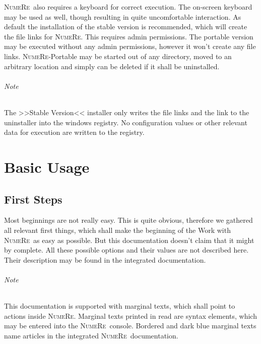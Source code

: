 \documentclass[DIV=14,headsepline,footsepline]{scrbook}
\newcommand{\NR}{\textsc{Nu\-me\-Re}}
\begin{document}
			\NR\ also requires a keyboard for correct execution. The on-screen keyboard may be used as well, though resulting in quite uncomfortable interaction.
			As default the installation of the stable version is recommended, which will create the file links for \NR. This requires admin permissions. The portable version may be executed without any admin permissions, however it won't create any file links. \NR-Portable may be started out of any directory, moved to an arbitrary location and simply can be deleted if it shall be uninstalled.
			\paragraph{Note}
				The >>Stable Version<< installer only writes the file links and the link to the uninstaller into the windows registry. No configuration values or other relevant data for execution are written to the registry.
	\part{Basic Usage}
		\chapter{First Steps}
			Most beginnings are not really easy. This is quite obvious, therefore we gathered all relevant first things, which shall make the beginning of the Work with \NR\ as easy as possible. But this documentation doesn't claim that it might by complete. All these possible options and their values are not described here. Their description may be found in the integrated documentation.
			\paragraph{Note}
				This documentation is supported with marginal texts, which shall point to actions inside \NR. Marginal texts printed in read are syntax elements, which may be entered into the \NR\ console. Bordered and dark blue marginal texts name articles in the integrated \NR\ documentation.
\end{document}
